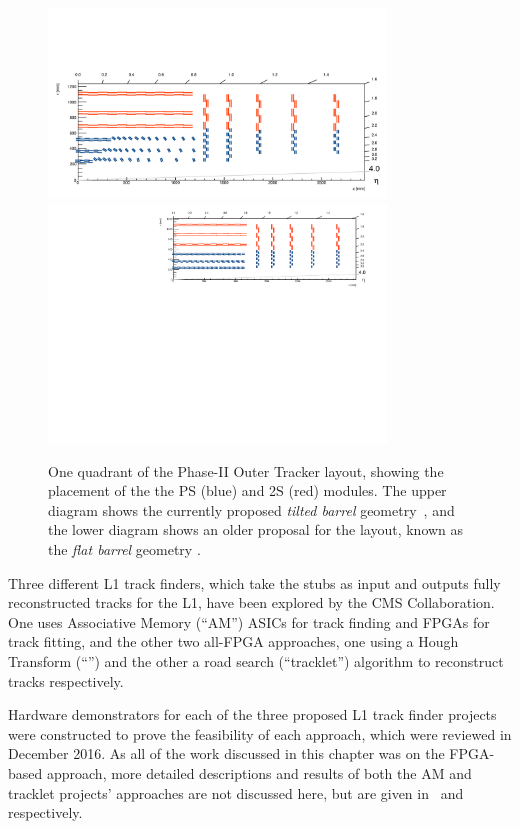 \begin{figure}[tbp]
\centering
\includegraphics[width=0.8\textwidth,trim={1.1truecm 0truecm 1truecm 12truecm},clip]{figs/tk-upgrade/tiltedbarrelmap.pdf}
\includegraphics[width=0.8\textwidth,trim={0.7truecm 0truecm 1truecm 0truecm},clip]{figs/tk-upgrade/mersilayout.pdf}
\caption{One quadrant of the Phase-II Outer Tracker layout, showing the placement of the the PS (blue) and 2S (red) modules. The upper diagram shows the currently proposed \emph{tilted barrel} geometry~\cite{tiltedGeometry, P2TrackerTDR}, and the lower diagram shows an older proposal for the layout, known as the \emph{flat barrel} geometry \cite{CMS_Upgrade_TP}.}
\label{fig:trackerlayout}
\end{figure}

Three different L1 track finders, which take the stubs as input and outputs fully reconstructed tracks for the L1, have been explored by the CMS Collaboration.
One uses Associative Memory (``AM'') ASICs for track finding and FPGAs for track fitting, and the other two all-FPGA approaches, one using a Hough Transform (``\HT'') and the other a road search (``tracklet'') algorithm to reconstruct tracks respectively.

Hardware demonstrators for each of the three proposed L1 track finder projects were constructed to prove the feasibility of each approach, which were reviewed in December 2016.
As all of the work discussed in this chapter was on the FPGA-based \HT approach, more detailed descriptions and results of both the AM and tracklet projects' approaches are not discussed here, but are given in~\cite{AM,P2TrackerTDR} and~\cite{tracklet,P2TrackerTDR} respectively.

